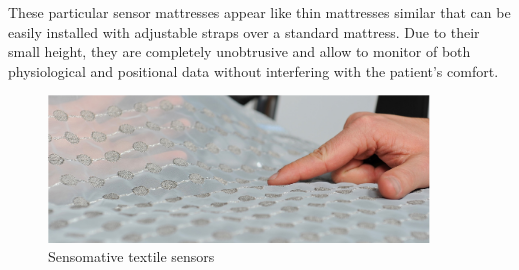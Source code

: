 These particular sensor mattresses appear like thin mattresses similar that can be easily installed with adjustable straps over a standard mattress. 
Due to their small height, they are completely unobtrusive and allow to monitor of both physiological and positional data without interfering with the patient's comfort.

\vspace{0.5cm}
\begin{figure}[h]
    \centering
     \includegraphics[width=0.9\textwidth]{img/sensomative.pdf}
     \caption{Sensomative textile sensors}
     \label{fig:sensomativeSensors}
 \end{figure}


